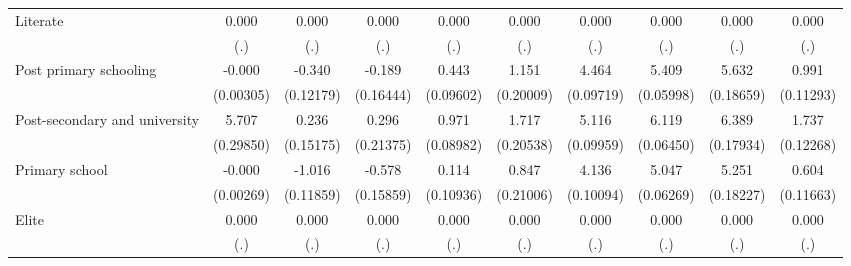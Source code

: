 {\begin{tabular}{l*{9}{c}}
Literate            &       0.000         &       0.000         &       0.000         &       0.000         &       0.000         &       0.000         &       0.000         &       0.000         &       0.000         \\
                    &         (.)         &         (.)         &         (.)         &         (.)         &         (.)         &         (.)         &         (.)         &         (.)         &         (.)         \\
Post primary schooling&      -0.000         &      -0.340\sym{**} &      -0.189         &       0.443\sym{***}&       1.151\sym{***}&       4.464\sym{***}&       5.409\sym{***}&       5.632\sym{***}&       0.991\sym{***}\\
                    &   (0.00305)         &   (0.12179)         &   (0.16444)         &   (0.09602)         &   (0.20009)         &   (0.09719)         &   (0.05998)         &   (0.18659)         &   (0.11293)         \\
Post-secondary and university&       5.707\sym{***}&       0.236         &       0.296         &       0.971\sym{***}&       1.717\sym{***}&       5.116\sym{***}&       6.119\sym{***}&       6.389\sym{***}&       1.737\sym{***}\\
                    &   (0.29850)         &   (0.15175)         &   (0.21375)         &   (0.08982)         &   (0.20538)         &   (0.09959)         &   (0.06450)         &   (0.17934)         &   (0.12268)         \\
Primary school      &      -0.000         &      -1.016\sym{***}&      -0.578\sym{***}&       0.114         &       0.847\sym{***}&       4.136\sym{***}&       5.047\sym{***}&       5.251\sym{***}&       0.604\sym{***}\\
                    &   (0.00269)         &   (0.11859)         &   (0.15859)         &   (0.10936)         &   (0.21006)         &   (0.10094)         &   (0.06269)         &   (0.18227)         &   (0.11663)         \\
Elite               &       0.000         &       0.000         &       0.000         &       0.000         &       0.000         &       0.000         &       0.000         &       0.000         &       0.000         \\
                    &         (.)         &         (.)         &         (.)         &         (.)         &         (.)         &         (.)         &         (.)         &         (.)         &         (.)         \\

\end{tabular}}
